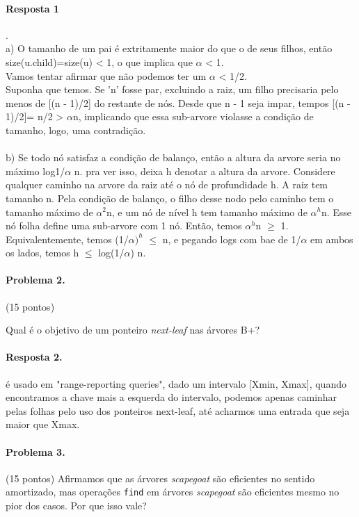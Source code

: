 \documentclass{article}
\begin{document}
\paragraph{Resposta 1}. \\
a) O tamanho de um pai é extritamente maior do que o de seus filhos, então size(u.child)=size(u) < 1, o que implica que $\alpha$ < 1. 
\\
Vamos tentar afirmar que não podemos ter um $\alpha$ < 1/2.
\\
Suponha que temos.  Se 'n' fosse par, excluindo a raiz, um filho precisaria pelo menos de    [(n - 1)/2] do restante de nós. Desde que n - 1 seja impar, tempos [(n - 1)/2]= n/2 > $\alpha$n, implicando que essa sub-arvore violasse a condição de tamanho, logo, uma contradição.
\\
\\
b) Se todo nó satisfaz a condição de balanço, então a altura da arvore seria no máximo log1/$\alpha$ n. pra ver isso, deixa h denotar a altura da arvore. Considere qualquer caminho na arvore da raiz até o nó de profundidade h. A raiz tem tamanho n. Pela condição de balanço, o filho desse nodo pelo caminho tem o tamanho máximo de $\alpha^2$n, e um nó de nível h tem tamanho máximo de $\alpha^h$n. Esse nó folha define uma sub-arvore com 1 nó. Então, temos $\alpha^h$n $\geq	$ 1. Equivalentemente, temos (1/$\alpha)^h$ $\leq$ n, e pegando logs com bae de 1/$\alpha$ em ambos os lados, temos h $\leq$ log(1/$\alpha$) n.


\paragraph{Problema 2.} (15 pontos)

Qual é o objetivo de um ponteiro \textit{next-leaf} nas árvores B+?

\paragraph{Resposta 2.} é usado em "range-reporting queries", dado um intervalo [Xmin, Xmax], quando encontramos a chave mais a esquerda do intervalo, podemos apenas caminhar pelas folhas pelo uso dos ponteiros next-leaf, até acharmos uma entrada que seja maior que Xmax.

\paragraph{Problema 3.} (15 pontos) 
Afirmamos que as árvores \textit{scapegoat} são eficientes no sentido amortizado, mas operações \texttt{find} em árvores \textit{scapegoat} são eficientes mesmo no pior dos casos. Por que isso vale?
\end{document}
